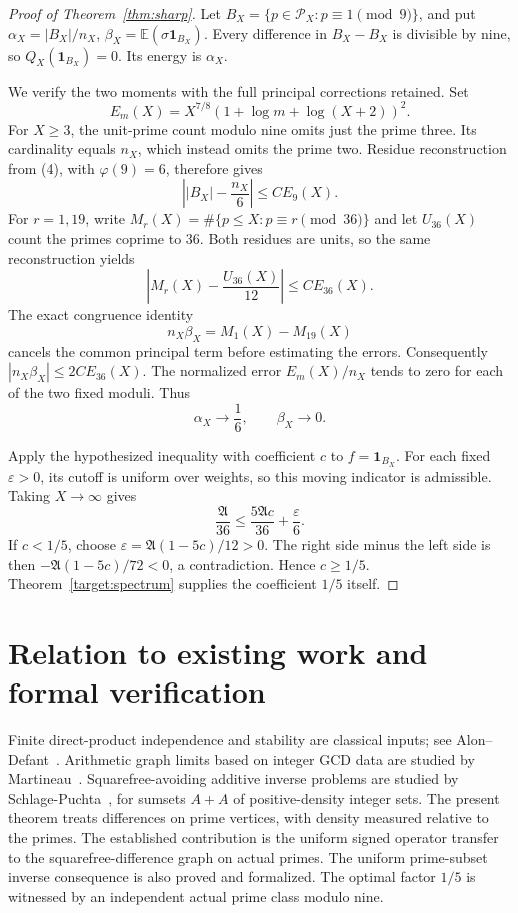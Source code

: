 \documentclass[11pt]{article}
\newcommand{\Pcal}{\mathcal P}
\newcommand{\E}{\mathbb E}
\newcommand{\Aconst}{\mathfrak A}
\begin{document}
\begin{proof}[Proof of Theorem~\ref{thm:sharp}]
Let \(B_X=\{p\in\Pcal_X:p\equiv1\pmod9\}\), and put
\(\alpha_X=|B_X|/n_X\), \(\beta_X=\E(\sigma\mathbf1_{B_X})\).
Every difference in \(B_X-B_X\) is divisible by nine, so
\(Q_X(\mathbf1_{B_X})=0\). Its energy is \(\alpha_X\).

We verify the two moments with the full principal corrections retained.
Set
\[
 E_m(X)=X^{7/8}(1+\log m+\log(X+2))^2 .
\]
For \(X\ge3\), the unit-prime count modulo nine omits just the prime
three. Its cardinality equals \(n_X\), which instead omits the prime two.
Residue reconstruction from (4), with \(\varphi(9)=6\), therefore gives
\[
 \left||B_X|-\frac{n_X}{6}\right|\le C E_9(X).
\]
For \(r=1,19\), write \(M_r(X)=\#\{p\le X:p\equiv r\pmod{36}\}\)
and let \(U_{36}(X)\) count the primes coprime to \(36\).
Both residues are units, so the same reconstruction yields
\[
 \left|M_r(X)-\frac{U_{36}(X)}{12}\right|\le C E_{36}(X).
\]
The exact congruence identity
\[
 n_X\beta_X=M_1(X)-M_{19}(X)
\]
cancels the common principal term before estimating the errors.
Consequently \(|n_X\beta_X|\le2C E_{36}(X)\).
The normalized error \(E_m(X)/n_X\) tends to zero for each of
the two fixed moduli. Thus
\[
 \alpha_X\longrightarrow\frac16,\qquad
 \beta_X\longrightarrow0 .
\]

Apply the hypothesized inequality with coefficient \(c\) to
\(f=\mathbf1_{B_X}\). For each fixed \(\varepsilon>0\), its cutoff
is uniform over weights, so this moving indicator is admissible.
Taking \(X\to\infty\) gives
\[
 \frac{\Aconst}{36}\le
 \frac{5\Aconst c}{36}+\frac{\varepsilon}{6}.
\]
If \(c<1/5\), choose
\(\varepsilon=\Aconst(1-5c)/12>0\). The right side minus the
left side is then \(-\Aconst(1-5c)/72<0\), a contradiction.
Hence \(c\ge1/5\). Theorem~\ref{target:spectrum} supplies the
coefficient \(1/5\) itself.
\end{proof}

\section{Relation to existing work and formal verification}

Finite direct-product independence and stability are classical inputs;
see Alon--Defant~\cite{AD}. Arithmetic graph limits based on integer
GCD data are studied by Martineau~\cite{M}.
Squarefree-avoiding additive inverse problems are studied by
Schlage-Puchta~\cite{SP}, for sumsets \(A+A\) of positive-density integer sets.
The present theorem treats differences on prime vertices, with density
measured relative to the primes.
The established contribution is the uniform signed operator transfer
to the squarefree-difference graph on actual primes.
The uniform prime-subset inverse consequence is also proved and formalized.
The optimal factor \(1/5\) is witnessed by an independent actual prime
class modulo nine.
\end{document}
